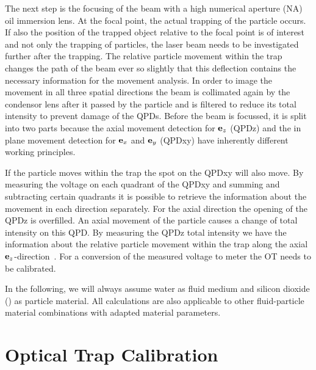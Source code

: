 The next step is the focusing of the beam with a high numerical aperture (NA) 
oil immersion lens. At the focal point, the actual trapping of the particle 
occurs. If also the position of the trapped object relative to the focal point 
is of interest and not only the trapping of particles, the laser beam needs to 
be investigated further after the trapping. The relative particle movement 
within the trap changes the path of the beam ever so slightly that this 
deflection contains the necessary information for the movement analysis. In 
order to image the movement in all three spatial directions the beam is 
collimated again by the condensor lens after it passed by the particle and is 
filtered to reduce its total intensity to prevent damage of the QPDs. Before 
the beam is focussed, it is split into two parts because the axial movement 
detection for $\vb{e}_{z}$ (QPDz) and the in plane movement detection for $\vb{e}_{x}$ and 
$\vb{e}_{y}$ (QPDxy) have inherently different working principles.

If the particle moves within the trap the spot on the QPDxy will also move. By 
measuring the voltage on each quadrant of the QPDxy and summing and subtracting 
certain quadrants it is possible to retrieve the information about the movement 
in each direction separately. For the axial direction the opening of the QPDz 
is overfilled. An axial movement of the particle causes a change of total 
intensity on this QPD. By measuring the QPDz total intensity we have the 
information about the relative particle movement within the trap along the 
axial $\vb{e}_{z}$-direction~\cite{Felgner1995a}. For a conversion of the measured 
voltage to meter the OT needs to be calibrated.

In the following, we will always assume water as fluid medium and silicon 
dioxide (\SiO) as particle material. All calculations are also applicable to 
other fluid-particle material combinations with adapted material parameters.

\section{Optical Trap Calibration}

